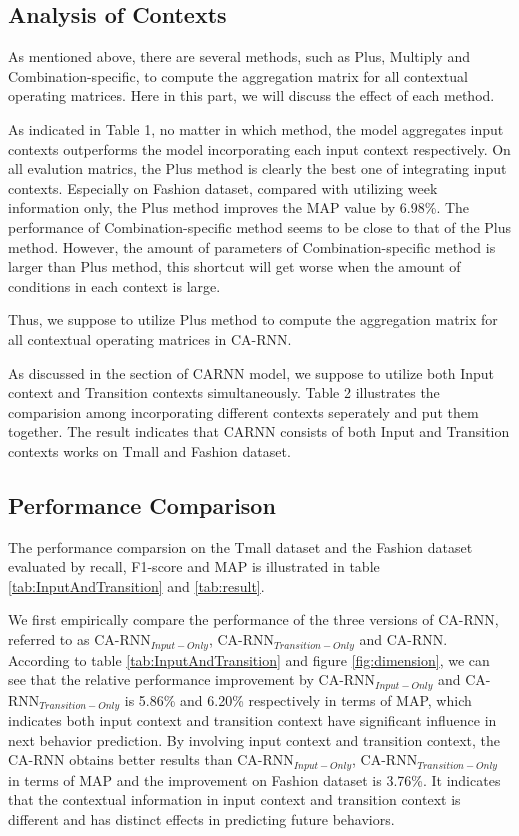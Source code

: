 \documentclass[conference]{IEEEtran}
\begin{document}
\subsection{Analysis of Contexts}
As mentioned above, there are several methods, such as Plus, Multiply and Combination-specific, to compute the aggregation matrix for all contextual operating matrices. Here in this part, we will discuss the effect of each method.

As indicated in Table 1, no matter in which method, the model aggregates input contexts outperforms the model incorporating each input context respectively. On all evalution matrics, the Plus method is clearly the best one of integrating input contexts. Especially on Fashion dataset, compared with utilizing week information only, the Plus method improves the MAP value by 6.98\%. The performance of Combination-specific method seems to be close to that of the Plus method. However, the amount of parameters of Combination-specific method is larger than Plus method, this shortcut will get worse when the amount of conditions in each context is large. 

Thus, we suppose to utilize Plus method to compute the aggregation matrix for all contextual operating matrices in CA-RNN.

As discussed in the section of CARNN model, we suppose to utilize both Input context and Transition contexts simultaneously. Table 2  illustrates the comparision among incorporating different contexts seperately and put them together. The result indicates that CARNN consists of both Input and Transition contexts works on Tmall and Fashion dataset. 


\subsection{Performance Comparison}
The performance comparsion on the Tmall dataset and the Fashion dataset evaluated by recall, F1-score and MAP is illustrated in table \ref{tab:InputAndTransition} and \ref{tab:result}. 

We first empirically compare the performance of the three versions of CA-RNN, referred to as CA-RNN$_{Input-Only}$, CA-RNN$_{Transition-Only}$ and CA-RNN. According to table \ref{tab:InputAndTransition} and figure \ref{fig:dimension}, we can see that the relative performance improvement by CA-RNN$_{Input-Only}$ and CA-RNN$_{Transition-Only}$ is 5.86\% and 6.20\% respectively in terms of MAP, which indicates both input context and transition context have significant influence in next behavior prediction. By involving input context and transition context, the CA-RNN obtains better results than CA-RNN$_{Input-Only}$, CA-RNN$_{Transition-Only}$ in terms of MAP and the improvement on Fashion dataset is 3.76\%. It indicates that the contextual information in input context and transition context is different and has distinct effects in predicting future behaviors.
\end{document}
